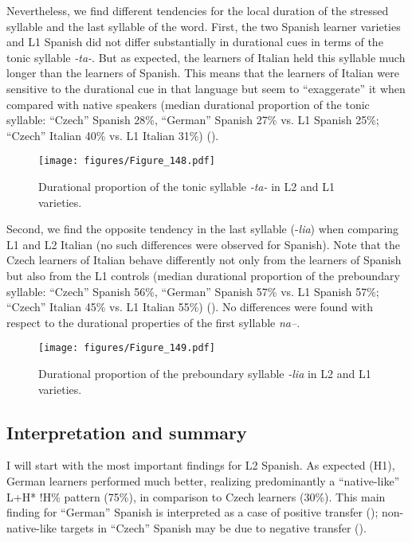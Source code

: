 Nevertheless, we find different tendencies for the local duration of the stressed syllable and the last syllable of the word. First, the two Spanish learner varieties and L1 Spanish did not differ substantially in durational cues in terms of the tonic syllable \textit{{}-ta-}. But as expected, the learners of Italian held this syllable much longer than the learners of Spanish. This means that the learners of Italian were sensitive to the durational cue in that language but seem to “exaggerate” it when compared with native speakers (median durational proportion of the tonic syllable: “Czech” Spanish 28\%, “German” Spanish 27\% vs. L1 Spanish 25\%; “Czech” Italian 40\% vs. L1 Italian 31\%) ().

\begin{figure}


\texttt{[image: figures/Figure\_148.pdf]}



\caption{Durational proportion of the tonic syllable \textit{{}-ta-} in L2 and L1 varieties.}
\label{fig:4.148}
\end{figure}

Second, we find the opposite tendency in the last syllable (-\textit{lia}) when comparing L1 and L2 Italian (no such differences were observed for Spanish). Note that the Czech learners of Italian behave differently not only from the learners of Spanish but also from the L1 controls (median durational proportion of the preboundary syllable: “Czech” Spanish 56\%, “German” Spanish 57\% vs. L1 Spanish 57\%; “Czech” Italian 45\% vs. L1 Italian 55\%) (). No differences were found with respect to the durational properties of the first syllable \textit{na–}.

\begin{figure}


\texttt{[image: figures/Figure\_149.pdf]}



\caption{Durational proportion of the preboundary syllable \textit{{}-lia} in L2 and L1 varieties.}
\label{fig:4.149}
\end{figure}

\subsection{Interpretation and summary}\label{sec:4.5.5}
\begin{sloppypar}
I will start with the most important findings for L2 Spanish. As expected (H1), German learners performed much better, realizing predominantly a “native-like” L+H* !H\% pattern (75\%), in comparison to Czech learners (30\%). This main finding for “German” Spanish is interpreted as a case of positive transfer (); non-native-like targets in “Czech” Spanish may be due to negative transfer ().
\end{sloppypar}

